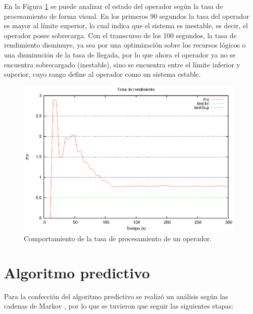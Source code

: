En la Figura \ref{fig:umbrales} se puede analizar el estado del operador según la tasa de procesamiento de forma visual. En los primeros 90 segundos la tasa del operador es mayor al límite superior, lo cual indica que el sistema es inestable, es decir, el operador posee sobrecarga. Con el transcurso de los 100 segundos, la tasa de rendimiento disminuye, ya sea por una optimización sobre los recursos lógicos o una disminución de la tasa de llegada, por lo que ahora el operador ya no se encuentra sobrecargado (inestable), sino se encuentra entre el límite inferior y superior, cuyo rango define al operador como un sistema estable.

\begin{figure}[hb!]
  \centering
    \includegraphics[scale=0.8]{images/Umbrales.eps}
  \caption{Comportamiento de la tasa de procesamiento de un operador.}
  \label{fig:umbrales}
\end{figure}


\section{Algoritmo predictivo}
Para la confección del algoritmo predictivo se realizó un análisis según las cadenas de Markov \citep{ching2006markov}, por lo que se tuvieron que seguir las siguientes etapas:

